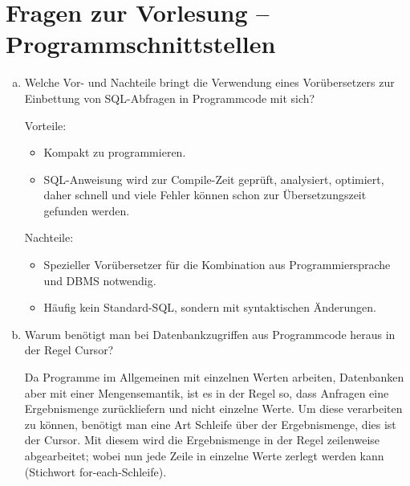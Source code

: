 \section{Fragen zur Vorlesung -- Programmschnittstellen}

\begin{enumerate}[a)]
	\item Welche Vor- und Nachteile bringt die Verwendung eines Vorübersetzers zur Einbettung von SQL-Abfragen in Programmcode mit sich?

	\begin{solution}
	Vorteile:
	\begin{itemize}
		\item Kompakt zu programmieren.
		\item SQL-Anweisung wird zur Compile-Zeit geprüft, analysiert, optimiert, daher schnell und viele Fehler können schon zur Übersetzungszeit gefunden werden.
	\end{itemize}
	Nachteile:
	\begin{itemize}
		\item Spezieller Vorübersetzer für die Kombination aus Programmiersprache und DBMS notwendig.
		\item Häufig kein Standard-SQL, sondern mit syntaktischen Änderungen.
	\end{itemize}
	\end{solution}

	\begin{note}
	\begin{center}
	\end{center}
	\end{note}

	\item Warum benötigt man bei Datenbankzugriffen aus Programmcode heraus in der Regel Cursor?

	\begin{solution}
	Da Programme im Allgemeinen mit einzelnen Werten arbeiten, Datenbanken aber mit einer Mengensemantik, ist es in der Regel so, dass Anfragen eine Ergebnismenge zurückliefern und nicht einzelne Werte.
	Um diese verarbeiten zu können, benötigt man eine Art Schleife über der Ergebnismenge, dies ist der Cursor. Mit diesem wird die Ergebnismenge in der Regel zeilenweise abgearbeitet; wobei nun jede Zeile in einzelne Werte zerlegt werden kann (Stichwort for-each-Schleife).
	\end{solution}

\end{enumerate}